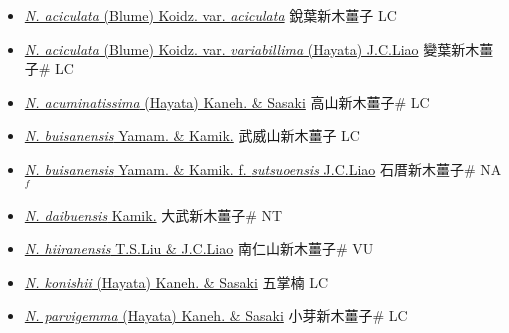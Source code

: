 \begin{itemize}
  \begin{itemize}
        \item[] \href{http://www.theplantlist.org/tpl1.1/search?q=Neolitsea+aciculata+var.+aciculata}{\textit{N. aciculata} (Blume) Koidz. var. \textit{aciculata}}   銳葉新木薑子 LC
        \item[] \href{http://www.theplantlist.org/tpl1.1/search?q=Neolitsea+aciculata+var.+variabillima}{\textit{N. aciculata} (Blume) Koidz. var. \textit{variabillima} (Hayata) J.C.Liao}   變葉新木薑子\# LC
        \item[] \href{http://www.theplantlist.org/tpl1.1/search?q=Neolitsea+acuminatissima}{\textit{N. acuminatissima} (Hayata) Kaneh. \& Sasaki}   高山新木薑子\# LC
        \item[] \href{http://www.theplantlist.org/tpl1.1/search?q=Neolitsea+buisanensis}{\textit{N. buisanensis} Yamam. \& Kamik.}   武威山新木薑子 LC
        \item[] \href{http://www.theplantlist.org/tpl1.1/search?q=Neolitsea+buisanensis+ f. +sutsuoensis}{\textit{N. buisanensis} Yamam. \& Kamik.  f.  \textit{sutsuoensis} J.C.Liao}   石厝新木薑子\# NA$^f$
        \item[] \href{http://www.theplantlist.org/tpl1.1/search?q=Neolitsea+daibuensis}{\textit{N. daibuensis} Kamik.}   大武新木薑子\# NT
        \item[] \href{http://www.theplantlist.org/tpl1.1/search?q=Neolitsea+hiiranensis}{\textit{N. hiiranensis} T.S.Liu \& J.C.Liao}   南仁山新木薑子\# VU
        \item[] \href{http://www.theplantlist.org/tpl1.1/search?q=Neolitsea+konishii}{\textit{N. konishii} (Hayata) Kaneh. \& Sasaki}   五掌楠 LC
        \item[] \href{http://www.theplantlist.org/tpl1.1/search?q=Neolitsea+parvigemma}{\textit{N. parvigemma} (Hayata) Kaneh. \& Sasaki}   小芽新木薑子\# LC

\end{itemize}
\end{itemize}
